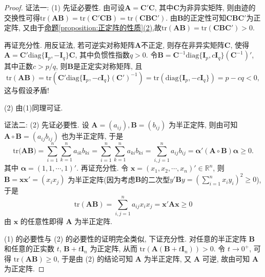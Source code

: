 \documentclass[../../main.tex]{subfiles}
\begin{document}
\begin{proof}
{\color{blue}证法一:}
(1) 先证必要性. 由可设$\boldsymbol{A}=\boldsymbol{C}'\boldsymbol{C}$, 其中$\boldsymbol{C}$为非异实矩阵, 则由迹的交换性可得$\text{tr}(\boldsymbol{A}\boldsymbol{B}) = \text{tr}(\boldsymbol{C}'\boldsymbol{C}\boldsymbol{B}) = \text{tr}(\boldsymbol{C}\boldsymbol{B}\boldsymbol{C}')$. 由$\boldsymbol{B}$的正定性可知$\boldsymbol{C}\boldsymbol{B}\boldsymbol{C}'$为正定阵, 又由于\hyperref[proposition:正定阵的性质]{命题\ref{proposition:正定阵的性质}(2)},故$\text{tr}(\boldsymbol{A}\boldsymbol{B}) = \text{tr}(\boldsymbol{C}\boldsymbol{B}\boldsymbol{C}')>0$.

再证充分性. 用反证法, 若可逆实对称矩阵$\boldsymbol{A}$不正定, 则存在非异实矩阵$\boldsymbol{C}$, 使得$\boldsymbol{A}=\boldsymbol{C}'\text{diag}\{\boldsymbol{I}_p, -\boldsymbol{I}_q\}\boldsymbol{C}$, 其中负惯性指数$q > 0$. 令$\boldsymbol{B}=\boldsymbol{C}^{-1}\text{diag}\{\boldsymbol{I}_p, c\boldsymbol{I}_q\}(\boldsymbol{C}^{-1})'$, 其中正数$c > p/q$, 则$\boldsymbol{B}$是正定实对称矩阵, 且
\[
\text{tr}(\boldsymbol{A}\boldsymbol{B}) = \text{tr}\left(\boldsymbol{C}'\text{diag}\{\boldsymbol{I}_p, -c\boldsymbol{I}_q\}(\boldsymbol{C}')^{-1}\right) = \text{tr}(\text{diag}\{\boldsymbol{I}_p, -c\boldsymbol{I}_q\}) = p - cq < 0,
\]
这与假设矛盾!

(2) 由(1)同理可证. 

{\color{blue}证法二:}
(2) 先证必要性. 设 \(\boldsymbol{A}=(a_{ij}),\boldsymbol{B}=(b_{ij})\) 为半正定阵, 则由可知 \(\boldsymbol{A}\circ\boldsymbol{B}=(a_{ij}b_{ij})\) 也为半正定阵, 于是
\[\mathrm{tr(}\boldsymbol{AB})=\sum_{i=1}^n{\sum_{k=1}^n{a_{ik}b_{ki}}}=\sum_{i=1}^n{\sum_{k=1}^n{a_{ki}b_{ki}}}=\sum_{i,j=1}^n{a_{ij}b_{ij}}=\boldsymbol{\alpha }'(\boldsymbol{A}\circ \boldsymbol{B})\boldsymbol{\alpha }\ge 0.\]
其中 \(\boldsymbol{\alpha}=(1,1,\cdots,1)'\). 再证充分性. 令 \(\boldsymbol{x}=(x_1,x_2,\cdots,x_n)'\in\mathbb{R}^n\), 则 \(\boldsymbol{B}=\boldsymbol{x}\boldsymbol{x}'=(x_ix_j)\) 为半正定阵(因为考虑$\boldsymbol{B}$的二次型$y'\boldsymbol{B}y=\left( \sum_{i=1}^n{x_iy_i} \right) ^2\geqslant 0$), 于是
\[\mathrm{tr}(\boldsymbol{A}\boldsymbol{B})=\sum_{i,j = 1}^{n}a_{ij}x_ix_j=\boldsymbol{x}'\boldsymbol{A}\boldsymbol{x}\geqslant 0\]
由 \(\boldsymbol{x}\) 的任意性即得 \(\boldsymbol{A}\) 为半正定阵.

(1) 的必要性与 (2) 的必要性的证明完全类似, 下证充分性. 对任意的半正定阵 \(\boldsymbol{B}\) 和任意的正实数 \(t\), \(\boldsymbol{B}+t\boldsymbol{I}_n\) 为正定阵, 从而 \(\mathrm{tr}(\boldsymbol{A}(\boldsymbol{B}+t\boldsymbol{I}_n))>0\). 令 \(t\to0^+\), 可得 \(\mathrm{tr}(\boldsymbol{A}\boldsymbol{B})\geqslant 0\), 于是由 (2) 的结论可知 \(\boldsymbol{A}\) 为半正定阵, 又 \(\boldsymbol{A}\) 可逆, 故由可知 \(\boldsymbol{A}\) 为正定阵.


\end{proof}
\end{document}
